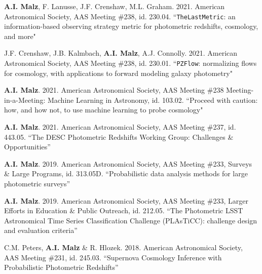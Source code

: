 \clearpage
{}
\nopagebreak\begin{list}{}{\malzlist}
	
	\item {\bf A.I. Malz}, F. Lanusse, J.F. Crenshaw, M.L. Graham. 2021. American Astronomical Society, AAS Meeting \#238, id. 230.04. ``\texttt{TheLastMetric}: an information-based observing strategy metric for photometric redshifts, cosmology, and more" 
	
	\item J.F. Crenshaw, J.B. Kalmbach, {\bf A.I. Malz}, A.J. Connolly. 2021. American Astronomical Society, AAS Meeting \#238, id. 230.01. ``\texttt{PZFlow}: normalizing flows for cosmology, with applications to forward modeling galaxy photometry" 
	
	\item {\bf A.I. Malz}. 2021. American Astronomical Society, AAS Meeting \#238 Meeting-in-a-Meeting: Machine Learning in Astronomy, id. 103.02. ``Proceed with caution: how, and how not, to use machine learning to probe cosmology" 
	
	\item {\bf A.I. Malz}. 2021. American Astronomical Society, AAS Meeting \#237, id. 443.05. ``The DESC Photometric Redshifts Working Group: Challenges \& Opportunities'' 
	
	\item {\bf A.I. Malz}. 2019. American Astronomical Society, AAS Meeting \#233, Surveys \& Large Programs, id. 313.05D. ``Probabilistic data analysis methods for large photometric surveys'' 
	\item {\bf A.I. Malz}. 2019. American Astronomical Society, AAS Meeting \#233, Larger Efforts in Education \& Public Outreach, id. 212.05. ``The Photometric LSST Astronomical Time Series Classification Challenge (PLAsTiCC): challenge design and evaluation criteria” 
	
	\item C.M. Peters, {\bf A.I. Malz} \& R. Hlozek. 2018. American Astronomical Society, AAS Meeting \#231, id. 245.03. ``Supernova Cosmology Inference with Probabilistic Photometric Redshifts'' 
	

\end{list}

